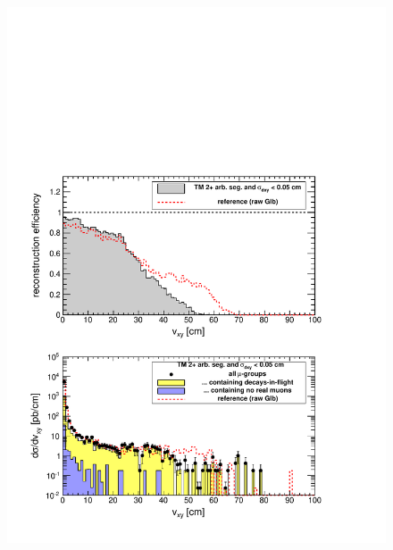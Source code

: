 \documentclass[12pt]{article}
\begin{document}
\begin{figure}
\begin{center}
\begin{multicols}{2}
\includegraphics[width=\linewidth]{fig/backgrounds3_plot/dispvert_TrackerSegMatch2DxyErr.pdf}


\end{multicols}
\end{center}
\end{figure}
\end{document}
